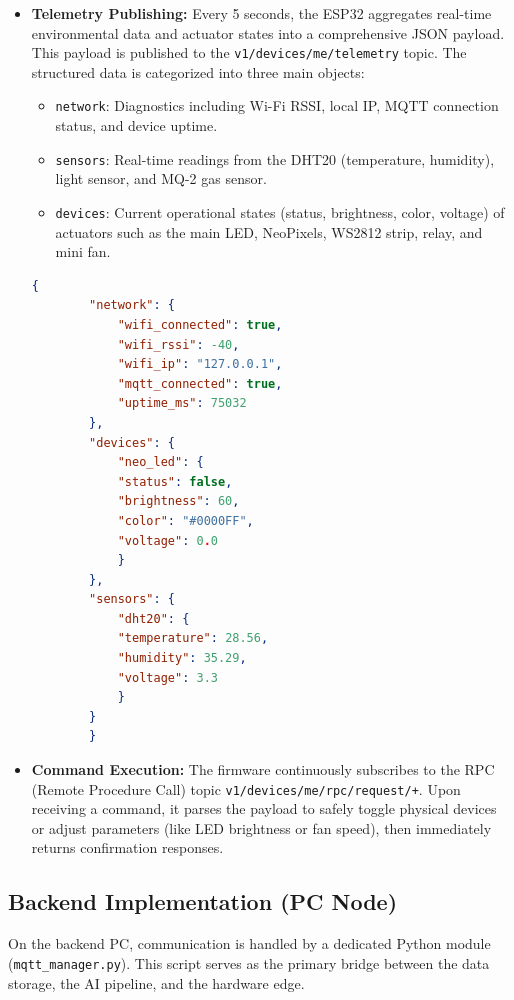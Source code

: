 \begin{itemize}
    \item \textbf{Telemetry Publishing:} Every 5 seconds, the ESP32 aggregates real-time environmental data and actuator states into a comprehensive JSON payload. This payload is published to the \texttt{v1/devices/me/telemetry} topic. The structured data is categorized into three main objects:
    \begin{itemize}
        \item \texttt{network}: Diagnostics including Wi-Fi RSSI, local IP, MQTT connection status, and device uptime.
        \item \texttt{sensors}: Real-time readings from the DHT20 (temperature, humidity), light sensor, and MQ-2 gas sensor.
        \item \texttt{devices}: Current operational states (status, brightness, color, voltage) of actuators such as the main LED, NeoPixels, WS2812 strip, relay, and mini fan.
    \end{itemize}

    \begin{lstlisting}[language=json, caption={Sample Telemetry JSON Payload published by ESP32}, label={lst:mqtt_telemetry}]
        {
        "network": {
            "wifi_connected": true,
            "wifi_rssi": -40,
            "wifi_ip": "127.0.0.1",
            "mqtt_connected": true,
            "uptime_ms": 75032
        },
        "devices": {
            "neo_led": {
            "status": false,
            "brightness": 60,
            "color": "#0000FF",
            "voltage": 0.0
            }
        },
        "sensors": {
            "dht20": {
            "temperature": 28.56,
            "humidity": 35.29,
            "voltage": 3.3
            }
        }
        }
    \end{lstlisting}
    \item \textbf{Command Execution:} The firmware continuously subscribes to the RPC (Remote Procedure Call) topic \texttt{v1/devices/me/rpc/request/+}. Upon receiving a command, it parses the payload to safely toggle physical devices or adjust parameters (like LED brightness or fan speed), then immediately returns confirmation responses.
\end{itemize}

\subsection{Backend Implementation (PC Node)}
On the backend PC, communication is handled by a dedicated Python module (\texttt{mqtt\_manager.py}). This script serves as the primary bridge between the data storage, the AI pipeline, and the hardware edge.

